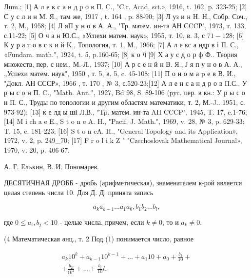 \documentclass[10pt]{article}
\begin{document}
Лum.: [1] А л е к с а н д р о в П. C., "C.r. Acad. sci.», 1916, t. 162, p. 323-25; [2] С у с л и н М. Я., там же, 1917 , t. 164 , p. 88-90; [3] Л уз и н H. Н., Собр. Соч., т. 2, М., 1958; [4] Л яП у н о в А. А., "Тр. матем. ин-та АН СCCР", 1973, т. 133, с.11-22; [5] О ч а н Ю.С., «Успехи матем. наук», 1955, т. 10, в. 3, с $71-128$; [6] К у р а т о в с к и й K., Топология, т. 1, М., 1966; [7] А л е кс а ндр в і П. С., «Fundam. math.", 1924, t. 5, p.160-65; [8] к о ग [9] Х а у с д о р ф Ф.. Теория множеств, пер. с нем., М.-Л., 1937; [10] А р с е н й н В. Я., Ј я п у н о в А. А., „Успехи матем. наук", 1950 , т. 5, в. 5, c. 45-108; [11] П о н о м а p е в В. И., "Докл. АН СССР», 1966 , т. 170 , № 3, с.520-23;[12] А л е н с а н д р о в П.С., У р ы с о н П. C., "Math. Ann.", 1927, Bd 98, S. 89-106 (pyc. пер. в кн.: У р ы с о н П. С., Труды по топологии и другим областям математики, т. 2, М.-J.. 1951, с. 973-92); [13] к е лд ы шІ Л.В., "Tp. матем. ин-та AH CCCP", 1945, T. 17, c.1-76; [14] M i ch a e E., S t o n e A. H., "Pacif. J. Math.", 1969, v. 28, № 3, p. 629-33; T. 15, c. 181-223; [16] S t o n eA. H., "General Topology and its Application», 1972, v. 2, p. 249\_70; [17] F r o l i k Z " "Czechoslovak Mathematical Journal», 1970, v. 20, p. 406-67.



А. Г. Елъкин, В. И. Пономарев.



ДЕСЯТИЧНАЯ ДРОББ - дробь (арифметическая), знаменателем к-рой является целая степень числа 10. Для Д. Д. принята запись



\[

a_{k} a_{k-1} \ldots a_{1} a_{0}, b_{1} b_{2} \ldots b_{l},

\]



где $0 \leqslant a_{i}, b_{j}<10$ - целые числа, причем, если $k \neq 0$, то и $a_{k} \neq 0$.



(4 Математическая әнц., т. 2 Под (1) понимается число, равное



\[

\begin{gathered}

a_{k} 10^{k}+a_{k-1} 10^{k-1}+\ldots+a_{1} 10+a_{0}+\frac{b_{1}}{10}+ \\

+\frac{b_{2}}{10^{2}}+\ldots+\frac{b_{l}}{10} l .

\end{gathered}

\]
\end{document}
